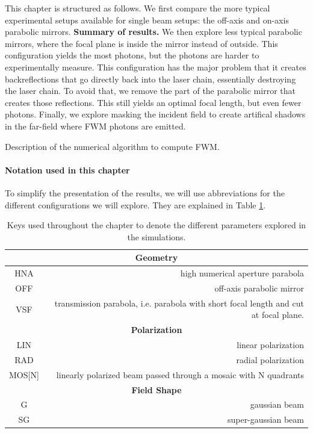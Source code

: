 \documentclass[11pt,SymmetricalJury]{inrsthesis/inrsthesis}
\begin{document}
This chapter is structured as follows. We first compare the more typical
experimental setups available for single beam setups: the off-axis and
on-axis parabolic mirrors. \textbf{Summary of results.} We then explore
less typical parabolic mirrors, where the focal plane is inside the mirror
instead of outside. This configuration yields the most photons, but the
photons are harder to experimentally measure. This configuration has the
major problem that it creates backreflections that go directly back into the
laser chain, essentially destroying the laser chain. To avoid that, we remove
the part of the parabolic mirror that creates those reflections. This still
yields an optimal focal length, but even fewer photons. Finally, we explore
masking the incident field to create artifical shadows in the far-field where
FWM photons are emitted.

Description of the numerical algorithm to compute FWM.

\paragraph{Notation used in this chapter}

To simplify the presentation of the results, we will use abbreviations for
the different configurations we will explore. They are explained in
Table \ref{tab:fwm.setups-abbreviations}.

\begin{table}
  \begin{tabular}{cr}
    \toprule
    \multicolumn{2}{c}{\textbf{Geometry}} \\
    \midrule
    HNA & high numerical aperture parabola \\
    OFF & off-axis parabolic mirror \\
    VSF & transmission parabola, i.e. parabola with short focal length and cut at focal plane. \\
    \midrule
    \multicolumn{2}{c}{\textbf{Polarization}} \\
    \midrule
    LIN & linear polarization \\
    RAD & radial polarization \\
    MOS[N] & linearly polarized beam passed through a mosaic with N quadrants \\
    \midrule
    \multicolumn{2}{c}{\textbf{Field Shape}} \\
    \midrule
    G   & gaussian beam \\
    SG  & super-gaussian beam \\
  \bottomrule
  \end{tabular}
  \caption{Keys used throughout the chapter to denote the different parameters
           explored in the simulations.}
  \label{tab:fwm.setups-abbreviations}
\end{table}
\end{document}
